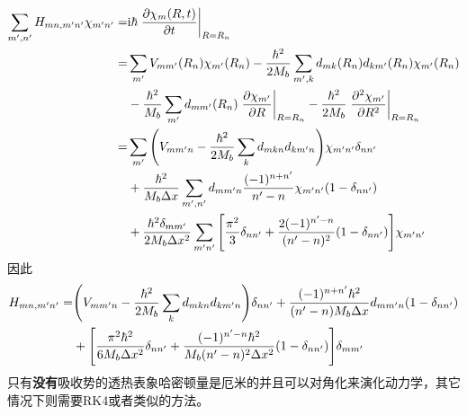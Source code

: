 \documentclass[UTF8,12pt]{article}
\begin{document}
        \begin{align}
            \sum_{m',n'}{H_{mn,m'n'}\chi_{m'n'}}=&\mathrm{i}\hbar\eval{\pdv{\chi_m(R,t)}{t}}_{R=R_n} \\
            =&\sum_{m'}{V_{mm'}(R_n)\chi_{m'}(R_n)}-\frac{\hbar^2}{2M_b}\sum_{m',k}{d_{mk}(R_n)d_{km'}(R_n)\chi_{m'}(R_n)} \nonumber \\
            &-\frac{\hbar^2}{M_b}\sum_{m'}{d_{mm'}(R_n)\eval{\pdv{\chi_{m'}}{R}}_{R=R_n}}-\frac{\hbar^2}{2M_b}\eval{\pdv[2]{\chi_{m'}}{R}}_{R=R_n} \\
            =&\sum_{m'}{\qty(V_{mm'n}-\frac{\hbar^2}{2M_b}\sum_k{d_{mkn}d_{km'n}})\chi_{m'n'}\delta_{nn'}} \nonumber \\
            &+\frac{\hbar^2}{M_b\Delta x}\sum_{m',n'}{d_{mm'n}\frac{(-1)^{n+n'}}{n'-n}\chi_{m'n'}(1-\delta_{nn'})} \nonumber \\
            &+\frac{\hbar^2\delta_{mm'}}{2M_b\Delta x^2}\sum_{m'n'}{\qty[\frac{\pi^2}{3}\delta_{nn'}+\frac{2(-1)^{n'-n}}{(n'-n)^2}(1-\delta_{nn'})]\chi_{m'n'}}
        \end{align}
        因此
        \begin{align}
            H_{mn,m'n'}=&\qty(V_{mm'n}-\frac{\hbar^2}{2M_b}\sum_k{d_{mkn}d_{km'n}})\delta_{nn'}+\frac{(-1)^{n+n'}\hbar^2}{(n'-n)M_b\Delta x}d_{mm'n}(1-\delta_{nn'}) \nonumber \\
            &+\qty[\frac{\pi^2\hbar^2}{6M_b\Delta x^2}\delta_{nn'}+\frac{(-1)^{n'-n}\hbar^2}{M_b(n'-n)^2\Delta x^2}(1-\delta_{nn'})]\delta_{mm'}
        \end{align}
        只有\textbf{没有}吸收势的透热表象哈密顿量是厄米的并且可以对角化来演化动力学，其它情况下则需要RK4或者类似的方法。
\end{document}
